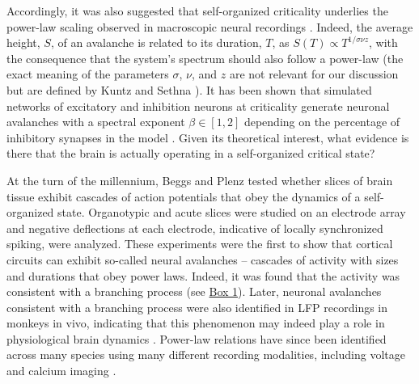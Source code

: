 Accordingly, it was also suggested that self-organized criticality underlies the power-law scaling observed in macroscopic neural recordings \cite{Lombardi2017}. Indeed, the average height, $S$, of an avalanche is related to its duration, $T$, as $S(T)\propto T^{1/\sigma\nu z}$, with the consequence that the system's spectrum should also follow a power-law \cite{Kuntz2000} (the exact meaning of the parameters $\sigma$, $\nu$, and $z$ are not relevant for our discussion but are defined by Kuntz and Sethna \cite{Kuntz2000}). It has been shown that simulated networks of excitatory and inhibition neurons at criticality generate neuronal avalanches with a spectral exponent $\beta\in[1,2]$ depending on the percentage of inhibitory synapses in the model \cite{Lombardi2017}. Given its theoretical interest, what evidence is there that the brain is actually operating in a self-organized critical state?

At the turn of the millennium, Beggs and Plenz \cite{Beggs2003} tested whether slices of brain tissue exhibit cascades of action potentials that obey the dynamics of a self-organized state. Organotypic and acute slices were studied on an electrode array and negative deflections at each electrode, indicative of locally synchronized spiking, were analyzed. These experiments were the first to show that cortical circuits can exhibit so-called neural avalanches – cascades of activity with sizes and durations that obey power laws. Indeed, it was found that the activity was consistent with a branching process (see \hyperref[box:first]{Box 1}). Later, neuronal avalanches consistent with a branching process were also identified in LFP recordings in monkeys in vivo, indicating that this phenomenon may indeed play a role in physiological brain dynamics \cite{Petermann2009}. Power-law relations have since been identified across many species using many different recording modalities, including voltage \cite{Scott2014} and calcium imaging \cite{Bellay2015,Ponce-Alvarez2018}.

